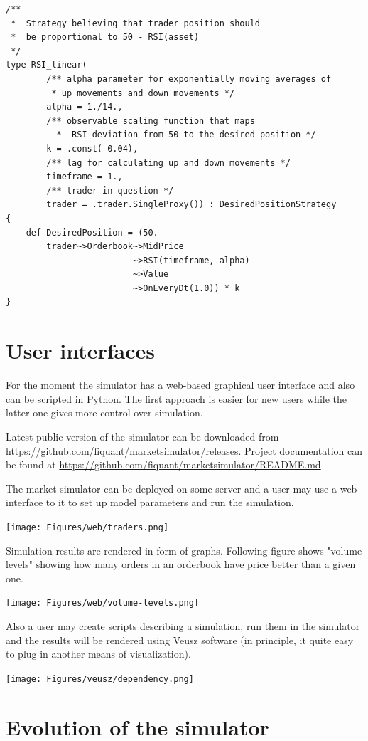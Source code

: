 \documentclass[a4paper,11pt]{article}
\begin{document}
\begin{verbatim}
/**
 *  Strategy believing that trader position should
 *  be proportional to 50 - RSI(asset)
 */
type RSI_linear(
        /** alpha parameter for exponentially moving averages of 
         * up movements and down movements */
        alpha = 1./14.,
        /** observable scaling function that maps
          *  RSI deviation from 50 to the desired position */
        k = .const(-0.04),
        /** lag for calculating up and down movements */
        timeframe = 1.,
        /** trader in question */
        trader = .trader.SingleProxy()) : DesiredPositionStrategy
{
    def DesiredPosition = (50. -
        trader~>Orderbook~>MidPrice
                         ~>RSI(timeframe, alpha)
                         ~>Value
                         ~>OnEveryDt(1.0)) * k
}
\end{verbatim}
\section{User interfaces}

For the moment the simulator has a web-based graphical user interface and also can be scripted in Python. The first approach is easier for new users while the latter one gives more control over simulation.

Latest public version of the simulator can be downloaded from
\url{https://github.com/fiquant/marketsimulator/releases}. Project documentation can be found at \url{https://github.com/fiquant/marketsimulator/README.md}

The market simulator can be deployed on some server and a user may use a web interface to it to set up model parameters and run the simulation. 

\centerline{\texttt{[image: Figures/web/traders.png]}}

Simulation results are rendered in form of graphs. Following figure shows "volume levels" showing  how many orders in an orderbook have price better than a given one.

\centerline{\texttt{[image: Figures/web/volume-levels.png]}}

Also a user may create scripts describing a simulation, run them in the simulator and the results will be rendered using Veusz software (in principle, it quite easy to plug in another means of visualization).

\centerline{\texttt{[image: Figures/veusz/dependency.png]}}

\section{Evolution of the simulator}\label{evolution-of-the-simulator}
\end{document}
